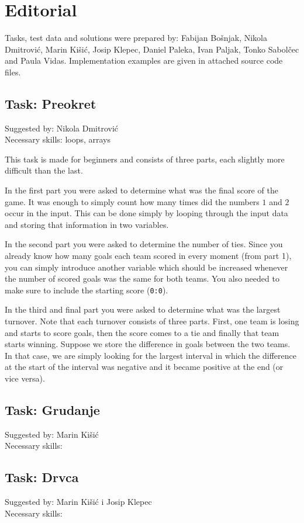 \documentclass[a4paper]{article}
\begin{document}
\section*{Editorial}
Tasks, test data and solutions were prepared by: Fabijan Bošnjak, Nikola
Dmitrović, Marin Kišić, Josip Klepec, Daniel Paleka, Ivan Paljak, Tonko
Sabolčec and Paula Vidas. Implementation examples are given
in attached source code files.

\subsection*{Task: Preokret}
\textsf{Suggested by: Nikola Dmitrović}\\
\textsf{Necessary skills: loops, arrays}

This task is made for beginners and consists of three parts, each slightly
more difficult than the last.

In the first part you were asked to determine what was the final score of the
game. It was enough to simply count how many times did the numbers $1$ and $2$
occur in the input. This can be done simply by looping through the input data
and storing that information in two variables.

In the second part you were asked to determine the number of ties. Since you
already know how many goals each team scored in every moment (from part 1),
you can simply introduce another variable which should be increased whenever
the number of scored goals was the same for both teams. You also needed to
make sure to include the starting score (\texttt{0:0}).

In the third and final part you were asked to determine what was the largest
turnover. Note that each turnover consists of three parts. First, one team is
losing and starts to score goals, then the score comes to a tie and finally that
team starts winning. Suppose we store the difference in goals between the two
teams. In that case, we are simply looking for the largest interval in which
the difference at the start of the interval was negative and it became positive
at the end (or vice versa).

\subsection*{Task: Grudanje}
\textsf{Suggested by: Marin Kišić}\\
\textsf{Necessary skills: }

\subsection*{Task: Drvca}
\textsf{Suggested by: Marin Kišić i Josip Klepec}\\
\textsf{Necessary skills: }
\end{document}
